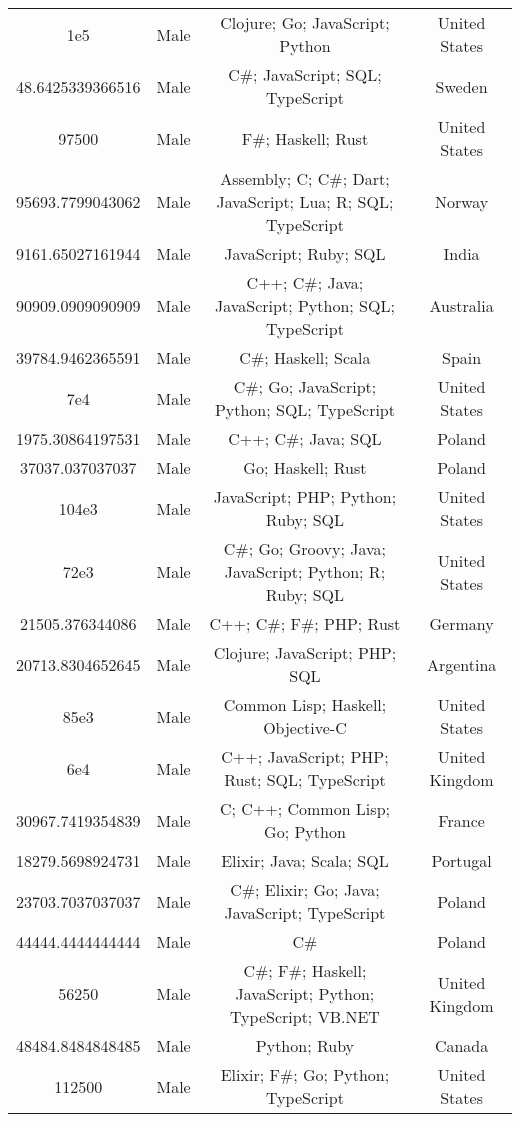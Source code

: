 \begin{center}
\begin{tabular}{ |c|c|c|c| }
1e5  &  Male  &  Clojure; Go; JavaScript; Python  &  United States  \\ 
48.6425339366516  &  Male  &  C\#; JavaScript; SQL; TypeScript  &  Sweden  \\ 
97500  &  Male  &  F\#; Haskell; Rust  &  United States  \\ 
95693.7799043062  &  Male  &  Assembly; C; C\#; Dart; JavaScript; Lua; R; SQL; TypeScript  &  Norway  \\ 
9161.65027161944  &  Male  &  JavaScript; Ruby; SQL  &  India  \\ 
90909.0909090909  &  Male  &  C++; C\#; Java; JavaScript; Python; SQL; TypeScript  &  Australia  \\ 
39784.9462365591  &  Male  &  C\#; Haskell; Scala  &  Spain  \\ 
7e4  &  Male  &  C\#; Go; JavaScript; Python; SQL; TypeScript  &  United States  \\ 
1975.30864197531  &  Male  &  C++; C\#; Java; SQL  &  Poland  \\ 
37037.037037037  &  Male  &  Go; Haskell; Rust  &  Poland  \\ 
104e3  &  Male  &  JavaScript; PHP; Python; Ruby; SQL  &  United States  \\ 
72e3  &  Male  &  C\#; Go; Groovy; Java; JavaScript; Python; R; Ruby; SQL  &  United States  \\ 
21505.376344086  &  Male  &  C++; C\#; F\#; PHP; Rust  &  Germany  \\ 
20713.8304652645  &  Male  &  Clojure; JavaScript; PHP; SQL  &  Argentina  \\ 
85e3  &  Male  &  Common Lisp; Haskell; Objective-C  &  United States  \\ 
6e4  &  Male  &  C++; JavaScript; PHP; Rust; SQL; TypeScript  &  United Kingdom  \\ 
30967.7419354839  &  Male  &  C; C++; Common Lisp; Go; Python  &  France  \\ 
18279.5698924731  &  Male  &  Elixir; Java; Scala; SQL  &  Portugal  \\ 
23703.7037037037  &  Male  &  C\#; Elixir; Go; Java; JavaScript; TypeScript  &  Poland  \\ 
44444.4444444444  &  Male  &  C\#  &  Poland  \\ 
56250  &  Male  &  C\#; F\#; Haskell; JavaScript; Python; TypeScript; VB.NET  &  United Kingdom  \\ 
48484.8484848485  &  Male  &  Python; Ruby  &  Canada  \\ 
112500  &  Male  &  Elixir; F\#; Go; Python; TypeScript  &  United States  \\ 

\end{tabular}
\end{center}
